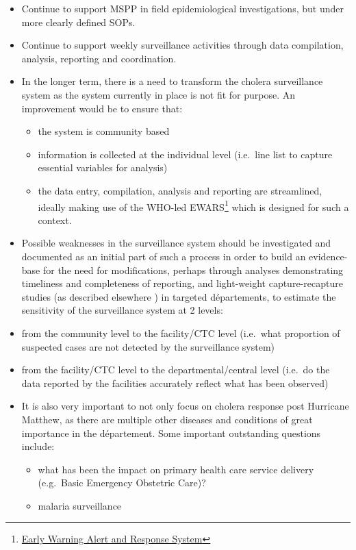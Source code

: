 \documentclass[]{tufte-handout}
\providecommand{\tightlist}{%
  \setlength{\itemsep}{0pt}\setlength{\parskip}{0pt}}
\begin{document}
\begin{itemize}
\tightlist
\item
  Continue to support MSPP in field epidemiological investigations, but
  under more clearly defined SOPs.
\item
  Continue to support weekly surveillance activities through data
  compilation, analysis, reporting and coordination.
\item
  In the longer term, there is a need to transform the cholera
  surveillance system as the system currently in place is not fit for
  purpose. An improvement would be to ensure that:

  \begin{itemize}
  \tightlist
  \item
    the system is community based
  \item
    information is collected at the individual level (i.e.~line list to
    capture essential variables for analysis)
  \item
    the data entry, compilation, analysis and reporting are streamlined,
    ideally making use of the WHO-led EWARS\footnote{\href{www.ewars-project.org}{Early
      Warning Alert and Response System}} which is designed for such a
    context.
  \end{itemize}
\item
  Possible weaknesses in the surveillance system should be investigated
  and documented as an initial part of such a process in order to build
  an evidence-base for the need for modifications, perhaps through
  analyses demonstrating timeliness and completeness of reporting, and
  light-weight capture-recapture studies (as described elsewhere
  \citep{Gignoux2015, Braeye2016}) in targeted départements, to estimate
  the sensitivity of the surveillance system at 2 levels:
\item
  from the community level to the facility/CTC level (i.e.~what
  proportion of suspected cases are not detected by the surveillance
  system)
\item
  from the facility/CTC level to the departmental/central level (i.e.~do
  the data reported by the facilities accurately reflect what has been
  observed)
\item
  It is also very important to not only focus on cholera response post
  Hurricane Matthew, as there are multiple other diseases and conditions
  of great importance in the département. Some important outstanding
  questions include:

  \begin{itemize}
  \tightlist
  \item
    what has been the impact on primary health care service delivery
    (e.g.~Basic Emergency Obstetric Care)?
  \item
    malaria surveillance


\end{itemize}
\end{itemize}
\end{document}

